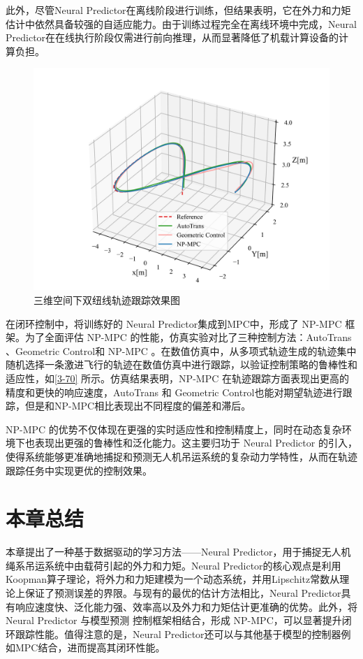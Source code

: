 \documentclass[lang=chs, degree=master, blindreview=false, winfonts=true]{yanputhesis}
\begin{document}
此外，尽管Neural Predictor在离线阶段进行训练，但结果表明，它在外力和力矩估计中依然具备较强的自适应能力。由于训练过程完全在离线环境中完成，Neural Predictor在在线执行阶段仅需进行前向推理，从而显著降低了机载计算设备的计算负担。
\begin{figure}[hbt!]
	\centering
	\includegraphics[width=36pc]{picture/kk/3d_trj.png} 
	\caption{三维空间下双纽线轨迹跟踪效果图} 
	\label{3-70}
\end{figure}

在闭环控制中，将训练好的 Neural Predictor集成到MPC中，形成了 NP-MPC 框架。为了全面评估 NP-MPC 的性能，仿真实验对比了三种控制方法：AutoTrans \cite{li2023autotrans}、Geometric Control\cite{sreenath2013geometric}和 NP-MPC 。在数值仿真中，从多项式轨迹生成的轨迹集中随机选择一条激进飞行的轨迹在数值仿真中进行跟踪，以验证控制策略的鲁棒性和适应性，如\autoref{3-70} 所示。仿真结果表明，NP-MPC 在轨迹跟踪方面表现出更高的精度和更快的响应速度，AutoTrans 和 Geometric Control也能对期望轨迹进行跟踪，但是和NP-MPC相比表现出不同程度的偏差和滞后。

NP-MPC 的优势不仅体现在更强的实时适应性和控制精度上，同时在动态复杂环境下也表现出更强的鲁棒性和泛化能力。这主要归功于 Neural Predictor 的引入，使得系统能够更准确地捕捉和预测无人机吊运系统的复杂动力学特性，从而在轨迹跟踪任务中实现更优的控制效果。


\section{本章总结}
本章提出了一种基于数据驱动的学习方法——Neural Predictor，用于捕捉无人机绳系吊运系统中由载荷引起的外力和力矩。Neural Predictor的核心观点是利用Koopman算子理论，将外力和力矩建模为一个动态系统，并用Lipschitz常数从理论上保证了预测误差的界限。与现有的最优的估计方法相比，Neural Predictor具有响应速度快、泛化能力强、效率高以及外力和力矩估计更准确的优势。此外，将 Neural Predictor 与模型预测 控制框架相结合，形成 NP-MPC，可以显著提升闭环跟踪性能。值得注意的是，Neural Predictor还可以与其他基于模型的控制器例如MPC结合，进而提高其闭环性能。
\end{document}

